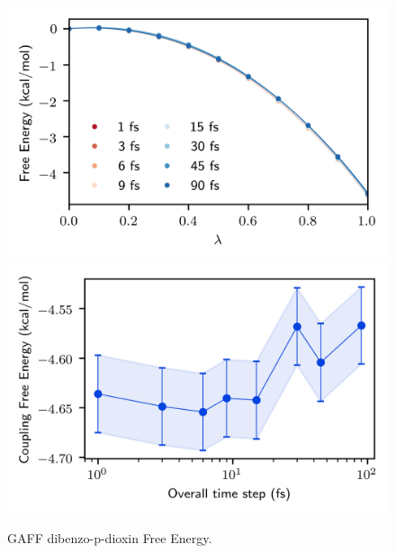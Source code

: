 \documentclass[
aip,
jcp,
reprint,
]{revtex4-1}
\begin{document}
\begin{figure}
	\centering
	\includegraphics{gaff_dibenzo-p-dioxin_coul_free_energy_profiles}
	\includegraphics{gaff_dibenzo-p-dioxin_coul_free_energies}
	\caption{GAFF dibenzo-p-dioxin Free Energy.}
	\label{fig:dibenzo-p-dioxin coulomb free energy}
\end{figure}




\end{document}
